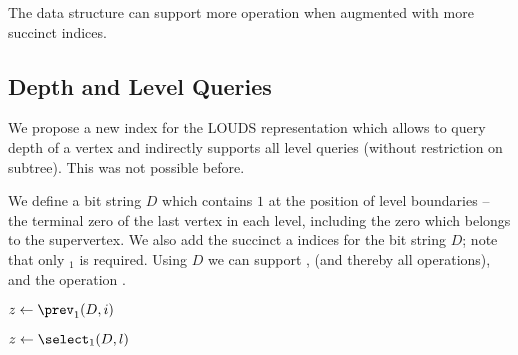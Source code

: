 \begin{algorithm}
\begin{algorithmic}
	\State {}
\EndFunction
\end{algorithmic}
\end{algorithm}

\begin{algorithm}
\begin{algorithmic}
 
	\State {}
\EndFunction
\end{algorithmic}
\end{algorithm}

\bigbreak

The data structure can support more operation when augmented with more succinct indices.

\subsection{Depth and Level Queries}

We propose a new index for the LOUDS representation which allows to query depth of a vertex and indirectly supports all level queries (without restriction on subtree).
This was not possible before.

We define a bit string $D$ which contains $1$ at the position of level boundaries -- the terminal zero of the last vertex in each level, including the zero which belongs to the supervertex.
We also add the succinct \rank{} a \select{} indices for the bit string $D$; note that only \select$_1$ is required.
Using $D$ we can support \levelRank{}, \levelSelect{} (and thereby all \levelAny{} operations), and the operation \dep{}.

\begin{algorithm}
\begin{algorithmic}
	\State $z \gets \prev_1(D, i)$ 
	\State {}
\EndFunction
\end{algorithmic}
\end{algorithm}

\begin{algorithm}
\begin{algorithmic}
	\State $z \gets \select_1(D, l)$ 
	\State {}
\EndFunction
\end{algorithmic}
\end{algorithm}

